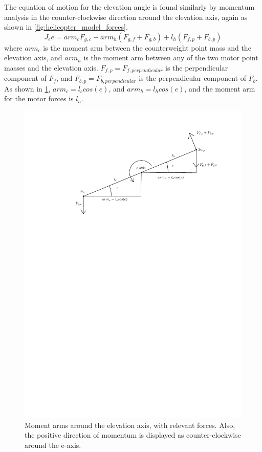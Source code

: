 The equation of motion for the elevation angle is found similarly
by momentum analysis in the counter-clockwise direction around the
elevation axis, again as shown in
\cref{fig:helicopter_model_forces}.
%
\begin{equation*}
  J_e\ddot{e} = arm_cF_{g,c} - arm_h(F_{g,f}+F_{g,b}) + l_h(F_{f,p} + F_{b,p})
\end{equation*}
%
where $arm_c$ is the moment arm between the counterweight point mass
and the elevation axis, and $arm_h$ is the moment arm between any of
the two motor point masses and the elevation axis. $F_{f,p} =
F_{f,perpendicular}$ is the perpendicular component of $F_f$, and
$F_{b,p} = F_{b,perpendicular}$ is the perpendicular component of
$F_b$. As shown in \cref{fig:elevation_model}, $arm_c = l_ccos(e)$,
and $arm_h = l_hcos(e)$, and the moment arm for the motor forces is $l_h$.
%
\begin{figure}[H]
  \caption{Moment arms around the elevation axis, with relevant
    forces. Also, the positive direction of momentum is displayed as
    counter-clockwise around the e-axis.}
  \label{fig:elevation_model}
  \includegraphics[width=1\textwidth]{images/elevation_model}
\end{figure}
